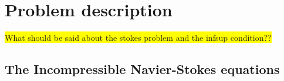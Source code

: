 
\chapter{Problem description} %

\label{description} %


\colorbox{yellow}{What should be said about the stokes problem and the infsup condition??}
\section{The Incompressible Navier-Stokes equations}

